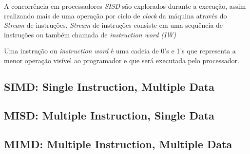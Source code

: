 A concorrência em processadores \textit{SISD} são explorados durante a execução,
assim realizando mais de uma operação por ciclo de \textit{clock} da máquina 
através do \textit{Stream} de instruções. \textit{Stream} de instruções 
consiste em uma sequência de instruções ou também chamada de 
\textit{instruction word (IW)}

Uma instrução ou \textit{instruction word} é uma cadeia de 0's e 1's que 
representa a menor operação visível ao programador e que será executada pelo 
processador.



\subsection{SIMD: Single Instruction, Multiple Data}



\subsection{MISD: Multiple Instruction, Single Data}



\subsection{MIMD: Multiple Instruction, Multiple Data}
 
